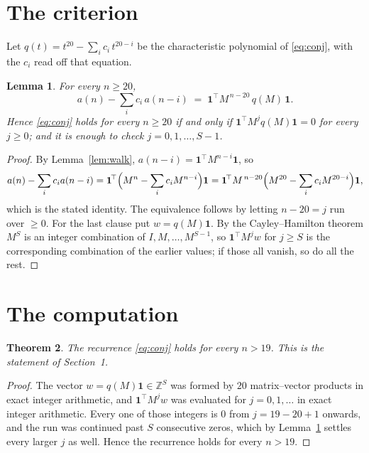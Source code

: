 \documentclass[11pt,a4paper]{article}
\theoremstyle{plain}
\newtheorem{theorem}{Theorem}
\newtheorem{lemma}[theorem]{Lemma}
\theoremstyle{definition}
\begin{document}
\section{The criterion}

Let $q(t)=t^{20}-\sum_{i}c_i\,t^{20-i}$ be the characteristic polynomial of
\eqref{eq:conj}, with the $c_i$ read off that equation.

\begin{lemma}\label{lem:crit}
For every $n\ge20$,
\[
a(n)-\sum_i c_i\,a(n-i)\;=\;\mathbf{1}^{\!\top}M^{\,n-20}\,q(M)\,\mathbf{1} .
\]
Hence \eqref{eq:conj} holds for every $n\ge20$ if and only if
$\mathbf{1}^{\!\top}M^{j}q(M)\mathbf{1}=0$ for every $j\ge0$; and it is enough to
check $j=0,1,\dots,S-1$.
\end{lemma}

\begin{proof}
By Lemma~\ref{lem:walk}, $a(n-i)=\mathbf{1}^{\!\top}M^{n-i}\mathbf{1}$, so
\[
a(n)-\sum_i c_i a(n-i)
=\mathbf{1}^{\!\top}\Bigl(M^{n}-\sum_i c_i M^{n-i}\Bigr)\mathbf{1}
=\mathbf{1}^{\!\top}M^{\,n-20}\Bigl(M^{20}-\sum_i c_i M^{20-i}\Bigr)\mathbf{1},
\]
which is the stated identity. The equivalence follows by letting $n-20=j$ run over
$\ge0$. For the last clause put $w=q(M)\mathbf{1}$. By the Cayley--Hamilton theorem
$M^{S}$ is an integer combination of $I,M,\dots,M^{S-1}$, so
$\mathbf{1}^{\!\top}M^{j}w$ for $j\ge S$ is the corresponding combination of the
earlier values; if those all vanish, so do all the rest.
\end{proof}

\section{The computation}

\begin{theorem}
The recurrence \eqref{eq:conj} holds for every $n>19$. This is the statement of
Section~1.
\end{theorem}

\begin{proof}
The vector $w=q(M)\mathbf{1}\in\mathbb{Z}^{S}$ was formed by $20$ matrix--vector
products in exact integer arithmetic, and $\mathbf{1}^{\!\top}M^{j}w$ was evaluated for
$j=0,1,\dots$ in exact integer arithmetic. Every one of those integers is $0$ from
$j=19-20+1$ onwards, and the run was continued past $S$ consecutive zeros, which by
Lemma~\ref{lem:crit} settles every larger $j$ as well. Hence the recurrence holds for
every $n>19$.
\end{proof}
\end{document}

